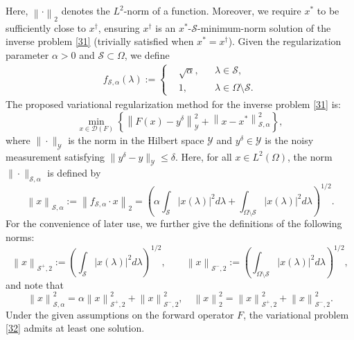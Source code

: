 \documentclass[11pt]{article}
\begin{document}
Here, $ \left\|\cdot\right\|_2 $ denotes the $ L^2 $-norm of a function.
Moreover, we require $ x^* $ to be sufficiently close to $ x^\dagger $, ensuring $ x^\dagger $ is an $ x^* $-$\mathcal{S}$-minimum-norm solution of the inverse problem \eqref{31} (trivially satisfied when $ x^* = x^\dagger $).
Given the regularization parameter $ \alpha>0 $ and $\mathcal{S}\subset\Omega$, we define                               
\begin{align*}
f_{\mathcal{S},\alpha}(\lambda) := \left\{
\begin{aligned}
&\sqrt{\alpha}, &&\lambda\in \mathcal{S},\\
&1, && \lambda\in \Omega\setminus\mathcal{S}.
\end{aligned}
\right.
\end{align*}
The proposed variational regularization method for the inverse problem \eqref{31} is:
\begin{equation}\label{32}
\min_{x\in \mathcal{D}(F)}\left\{\left\|F(x) - y^\delta\right\|^2_\mathcal{Y} + \left\|x - x^*\right\|_{\mathcal{S}, \alpha}^2\right\},
\end{equation}
where $ \|\cdot\|_\mathcal{Y} $ is the norm in the Hilbert space $ \mathcal{Y} $ and $ y^\delta\in\mathcal{Y} $ is the noisy measurement satisfying $ \|y^\delta-y\|_\mathcal{Y}\leq \delta $. 
Here, for all $ x\in L^2(\Omega) $, the norm $ \|\cdot\|_{\mathcal{S}, \alpha} $ is defined by
\begin{displaymath}
\left\|x\right\|_{\mathcal{S}, \alpha} := \left\|f_{\mathcal{S},\alpha}\cdot x\right\|_2 = \left(\alpha\int_{\mathcal{S}}|x(\lambda)|^2d\lambda + \int_{\Omega\setminus\mathcal{S}}|x(\lambda)|^2d\lambda\right)^{1/2}.
\end{displaymath}
For the convenience of later use, we further give the definitions of the following norms:
\begin{displaymath}
\left\|x\right\|_{\mathcal{S}^+, 2} := \left(\int_{\mathcal{S}}|x(\lambda)|^2d\lambda \right)^{1/2},\qquad \left\|x\right\|_{\mathcal{S}^-, 2} := \left(\int_{\Omega\setminus\mathcal{S}}|x(\lambda)|^2d\lambda \right)^{1/2},
\end{displaymath}
and note that
\begin{displaymath}
\left\|x\right\|_{\mathcal{S}, \alpha}^2 = \alpha\left\|x\right\|_{\mathcal{S}^+, 2}^2 + \left\|x\right\|_{\mathcal{S}^-, 2}^2,\quad \left\|x\right\|_2^2 = \left\|x\right\|_{\mathcal{S}^+, 2}^2 + \left\|x\right\|_{\mathcal{S}^-, 2}^2.
\end{displaymath}
Under the given assumptions on the forward operator $ F $, the variational problem \eqref{32} admits at least one solution. 
\end{document}

